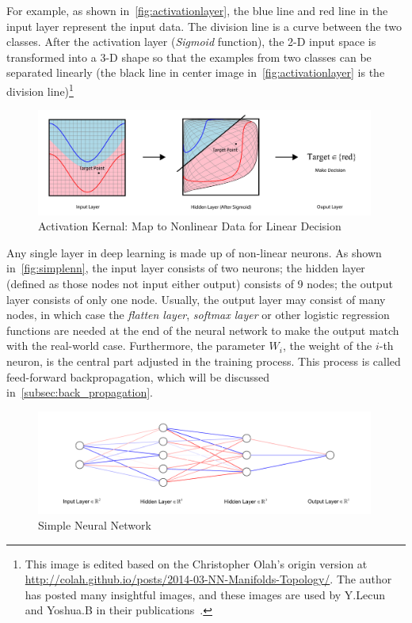 \begin{spacing}{1.5}
For example, as shown in~\autoref{fig:activationlayer}, the blue line and red line in the input layer represent the input data. The division line is a curve between the two classes. After the activation layer (\textit{Sigmoid} function), the 2-D input space is transformed into a 3-D shape so that the examples from two classes can be separated linearly (the black line in center image in~\autoref{fig:activationlayer} is the division line)\footnote{This image is edited based on the Christopher Olah's origin version at  \url{http://colah.github.io/posts/2014-03-NN-Manifolds-Topology/}. The author has posted many insightful images, and these images are used by Y.Lecun and Yoshua.B in their publications~\cite{bengio2017deep, lecun2015deep}.}


\begin{figure}[th]
\centering
\includegraphics[width=0.99\textwidth, fbox]{Chapter2/activation.pdf}
\caption{Activation Kernal: Map to Nonlinear Data for Linear Decision~\cite{olah2014neural}}
\label{fig:activationlayer} 
\end{figure}

Any single layer in deep learning is made up of non-linear neurons. As shown in~\autoref{fig:simplenn}, the input layer consists of two neurons; the hidden layer (defined as those nodes not input either output) consists of 9 nodes; the output layer consists of only one node. Usually, the output layer may consist of many nodes, in which case the \textit{flatten layer}, \textit{softmax layer} or other logistic regression functions are needed at the end of the neural network to make the output match with the real-world case. Furthermore, the parameter $W_i$, the weight of the $i$-th neuron, is the central part adjusted in the training process. This process is called feed-forward backpropagation, which will be discussed in~\autoref{subsec:back_propagation}.

\begin{figure}[th]
\centering
\includegraphics[width=0.99\textwidth, fbox]{Chapter2/simplenn.pdf}
\caption{Simple Neural Network}
\label{fig:simplenn} 
\end{figure}


\end{spacing}

